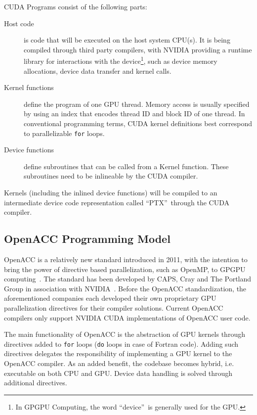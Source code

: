 CUDA Programs consist of the following parts: 

\begin{description}
 \item [Host code] is code that will be executed on the host system CPU(s). It is being compiled through third party compilers, with NVIDIA providing a runtime library for interactions with the device\footnote{In GPGPU Computing, the word \textquotedblleft device\textquotedblright\ is generally used for the GPU.}, such as device memory allocations, device data transfer and kernel calls. 
 \item [Kernel functions] define the program of one GPU thread. Memory access is usually specified by using an index that encodes thread ID and block ID of one thread. In conventional programming terms, CUDA kernel definitions best correspond to parallelizable \verb|for| loops.
 \item [Device functions] define subroutines that can be called from a Kernel function. These subroutines need to be inlineable by the CUDA compiler.
\end{description}

Kernels (including the inlined device functions) will be compiled to an intermediate device code representation called \textquotedblleft PTX\textquotedblright\ through the CUDA compiler.

\subsection{OpenACC Programming Model} \label{sub:openACCIntro}

OpenACC is a relatively new standard introduced in 2011, with the intention to bring the power of directive based parallelization, such as OpenMP, to GPGPU computing~\cite{beyerOpenMPforAcc}. The standard has been developed by CAPS, Cray and The Portland Group in association with NVIDIA~\cite{nvidiaOpenACC}. Before the OpenACC standardization, the aforementioned companies each developed their own proprietary GPU parallelization directives for their compiler solutions. Current OpenACC compilers only support NVIDIA CUDA implementations of OpenACC user code.

The main functionality of OpenACC is the abstraction of GPU kernels through directives added to \verb|for| loops (\verb|do| loops in case of Fortran code). Adding such directives delegates the responsibility of implementing a GPU kernel to the {OpenACC} compiler. As an added benefit, the codebase becomes hybrid, i.e. executable on both CPU and GPU. Device data handling is solved through additional directives.

